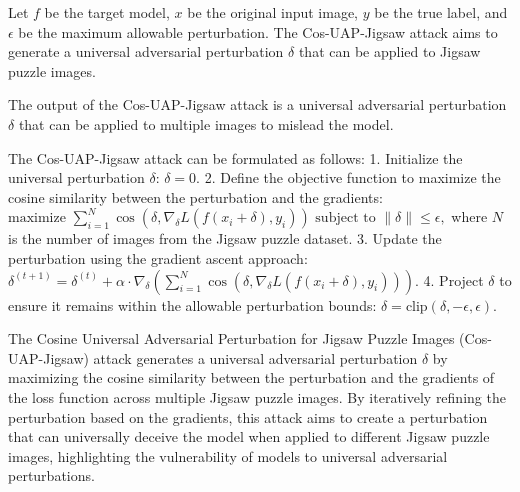 Let \( f \) be the target model, \( x \) be the original input image, \( y \) be the true label, and \( \epsilon \) be the maximum allowable perturbation. The Cos-UAP-Jigsaw attack aims to generate a universal adversarial perturbation \( \delta \) that can be applied to Jigsaw puzzle images.

The output of the Cos-UAP-Jigsaw attack is a universal adversarial perturbation \( \delta \) that can be applied to multiple images to mislead the model.

The Cos-UAP-Jigsaw attack can be formulated as follows:
1. Initialize the universal perturbation \( \delta \):
   $
   \delta = 0.
   $
2. Define the objective function to maximize the cosine similarity between the perturbation and the gradients:
   $
   \text{maximize } \sum_{i=1}^{N} \cos(\delta, \nabla_{\delta} L(f(x_i + \delta), y_i)) \text{ subject to } \|\delta\| \leq \epsilon,
   $
   where \( N \) is the number of images from the Jigsaw puzzle dataset.
3. Update the perturbation using the gradient ascent approach:
   $
   \delta^{(t+1)} = \delta^{(t)} + \alpha \cdot \nabla_{\delta} \left( \sum_{i=1}^{N} \cos(\delta, \nabla_{\delta} L(f(x_i + \delta), y_i)) \right).
   $
4. Project \( \delta \) to ensure it remains within the allowable perturbation bounds:
   $
   \delta = \text{clip}(\delta, -\epsilon, \epsilon).
   $

The Cosine Universal Adversarial Perturbation for Jigsaw Puzzle Images (Cos-UAP-Jigsaw) attack generates a universal adversarial perturbation \( \delta \) by maximizing the cosine similarity between the perturbation and the gradients of the loss function across multiple Jigsaw puzzle images. By iteratively refining the perturbation based on the gradients, this attack aims to create a perturbation that can universally deceive the model when applied to different Jigsaw puzzle images, highlighting the vulnerability of models to universal adversarial perturbations.
